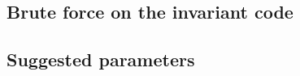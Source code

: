\documentclass[10pt]{article}
\newcommand{\s}{\vspace{0.3cm}}
\begin{document}
\subsection{Brute force on the invariant code}

\s

\subsection{Suggested parameters}



























\newpage


\end{document}

